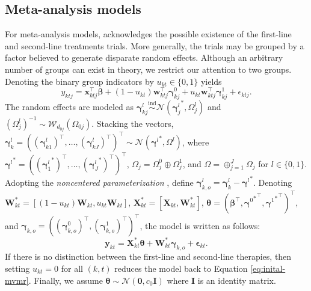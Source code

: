 \subsection{Meta-analysis models}\label{sec:mvma-model}
For meta-analysis models,  acknowledges the possible existence of the first-line and second-line treatments trials. More generally, the trials may be grouped by a factor believed to generate disparate random effects. Although an arbitrary number of groups can exist in theory, we restrict our attention to two groups. Denoting the binary group indicators by $u_{kt}\in \{0,1\}$ yields
\begin{equation}\label{eq:meta-first-second-line}
  y_{ktj} = \bm{x}_{ktj}^\top \bm{\beta} + (1-u_{kt})\bm{w}_{ktj}^\top \bm{\gamma}_{kj}^0 + u_{kt}\bm{w}_{ktj}^\top \bm{\gamma}_{kj}^1 + \epsilon_{ktj}.
\end{equation}
The random effects are modeled as $\bm{\gamma}_{kj}^{l} \overset{\text{ind}}{\sim} \mathcal{N}({\bm{\gamma}_j^l}^*, \Omega_j^{l})$ and $(\Omega_j^{l})^{-1} \sim
\mathcal{W}_{d_{0j}}(\Omega_{0j})$. Stacking the vectors, $\bm{\gamma}_k^l = ((\bm{\gamma}_{k1}^l)^\top,\ldots,(\bm{\gamma}_{kJ}^l)^\top)^\top \sim
\mathcal{N}({\bm{\gamma}^l}^*,\Omega^l)$, where ${\bm{\gamma}^l}^* = (({\bm{\gamma}_1^l}^*)^\top,\ldots,({\bm{\gamma}_J^l}^*)^\top)^\top$, $\Omega_j =\Omega_j^0 \oplus \Omega_j^1$, and $\Omega = \oplus_{j=1}^J \Omega_j$ for $l\in \{0,1\}$. Adopting the \emph{noncentered parameterization} \citep{bernardo2003non}, define $\bm{\gamma}_{k,o}^l = \bm{\gamma}_k^l - {\bm{\gamma}^l}^*$. Denoting $\bm{W}_{kt}^* = [(1-u_{kt})\bm{W}_{kt},
u_{kt}\bm{W}_{kt}]$, $\bm{X}_{kt}^* = [\bm{X}_{kt}, \bm{W}_{kt}^*]$, $\bm{\theta} = (\bm{\beta}^\top,{{\bm{\gamma}^0}^*}^\top,
{{\bm{\gamma}^1}^*}^\top)^\top$, and $\bm{\gamma}_{k,o}
= ((\bm{\gamma}_{k,o}^0)^\top, (\bm{\gamma}_{k,o}^1)^\top)^\top$, the model is written as follows:
\begin{equation}\label{eq:final-mvmr}
  \bm{y}_{kt} = \bm{X}_{kt}^*\bm{\theta} + \bm{W}_{kt}^* \bm{\gamma}_{k,o} + \bm{\epsilon}_{kt}.
\end{equation}
If there is no distinction between the first-line and second-line therapies, then setting $u_{kt} = 0$ for all $(k,t)$ reduces the model back to Equation \eqref{eq:inital-mvmr}. Finally, we assume $\boldsymbol{\theta}\sim \mathcal{N}(\boldsymbol{0},c_0\boldsymbol{I})$ where $\boldsymbol{I}$ is an identity matrix.

